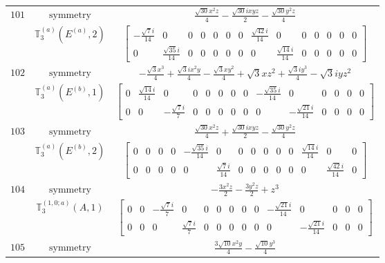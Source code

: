 \documentclass[fleqn,8pt,landscape]{jsarticle}
\begin{document}
\begin{longtable}{ccc}
$ 101 $ & $ \text{symmetry} $ & $ \frac{\sqrt{30} x^{2} z}{4} - \frac{\sqrt{30} i x y z}{2} - \frac{\sqrt{30} y^{2} z}{4} $ \\
$  $ & $ \mathbb{T}_{3}^{(a)}(E^{(a)},2) $ & $ \begin{bmatrix} - \frac{\sqrt{7} i}{14} & 0 & 0 & 0 & 0 & 0 & 0 & \frac{\sqrt{42} i}{14} & 0 & 0 & 0 & 0 & 0 & 0 \\ 0 & \frac{\sqrt{35} i}{14} & 0 & 0 & 0 & 0 & 0 & 0 & \frac{\sqrt{14} i}{14} & 0 & 0 & 0 & 0 & 0 \end{bmatrix} $ \\ \hline
$ 102 $ & $ \text{symmetry} $ & $ - \frac{\sqrt{3} x^{3}}{4} + \frac{\sqrt{3} i x^{2} y}{4} - \frac{\sqrt{3} x y^{2}}{4} + \sqrt{3} x z^{2} + \frac{\sqrt{3} i y^{3}}{4} - \sqrt{3} i y z^{2} $ \\
$  $ & $ \mathbb{T}_{3}^{(a)}(E^{(b)},1) $ & $ \begin{bmatrix} 0 & \frac{\sqrt{14} i}{14} & 0 & 0 & 0 & 0 & 0 & 0 & - \frac{\sqrt{35} i}{14} & 0 & 0 & 0 & 0 & 0 \\ 0 & 0 & - \frac{\sqrt{7} i}{7} & 0 & 0 & 0 & 0 & 0 & 0 & - \frac{\sqrt{21} i}{14} & 0 & 0 & 0 & 0 \end{bmatrix} $ \\ \hline
$ 103 $ & $ \text{symmetry} $ & $ \frac{\sqrt{30} x^{2} z}{4} + \frac{\sqrt{30} i x y z}{2} - \frac{\sqrt{30} y^{2} z}{4} $ \\
$  $ & $ \mathbb{T}_{3}^{(a)}(E^{(b)},2) $ & $ \begin{bmatrix} 0 & 0 & 0 & 0 & - \frac{\sqrt{35} i}{14} & 0 & 0 & 0 & 0 & 0 & 0 & \frac{\sqrt{14} i}{14} & 0 & 0 \\ 0 & 0 & 0 & 0 & 0 & \frac{\sqrt{7} i}{14} & 0 & 0 & 0 & 0 & 0 & 0 & \frac{\sqrt{42} i}{14} & 0 \end{bmatrix} $ \\ \hline
$ 104 $ & $ \text{symmetry} $ & $ - \frac{3 x^{2} z}{2} - \frac{3 y^{2} z}{2} + z^{3} $ \\
$  $ & $ \mathbb{T}_{3}^{(1,0;a)}(A,1) $ & $ \begin{bmatrix} 0 & 0 & - \frac{\sqrt{7} i}{7} & 0 & 0 & 0 & 0 & 0 & 0 & - \frac{\sqrt{21} i}{14} & 0 & 0 & 0 & 0 \\ 0 & 0 & 0 & \frac{\sqrt{7} i}{7} & 0 & 0 & 0 & 0 & 0 & 0 & - \frac{\sqrt{21} i}{14} & 0 & 0 & 0 \end{bmatrix} $ \\ \hline
$ 105 $ & $ \text{symmetry} $ & $ \frac{3 \sqrt{10} x^{2} y}{4} - \frac{\sqrt{10} y^{3}}{4} $ \\

\end{longtable}
\end{document}
